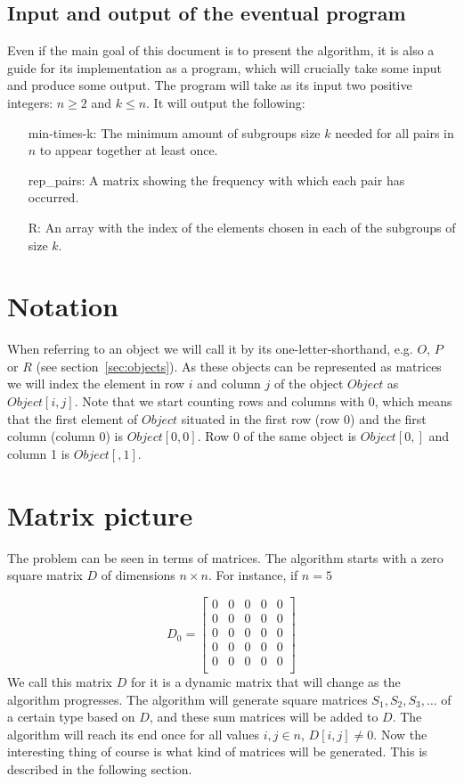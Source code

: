 \documentclass[a4paper]{article}
\begin{document}
\subsection{Input and output of the eventual program}

Even if the main goal of this document is to present the algorithm, it is also a guide for its implementation as a program, which will crucially take some input and produce some output.
The program will take as its input two positive integers: $ n \geq 2$ and $k \leq n$.
It will output the following:

\begin{itemize}
\item[min-times-k:]
The minimum amount of subgroups size $k$ needed for all pairs in $n$ to appear together at least once.
\item[rep\_pairs:]
A matrix showing the frequency with which each pair has occurred.
\item[R:] 
An array with the index of the elements chosen in each of the subgroups of size $k$.
\end{itemize}

\section{Notation}

When referring to an object we will call it by its one-letter-shorthand, e.g. $O$, $P$ or $R$ (see section~\ref{sec:objects}).
As these objects can be represented as matrices we will index the element in row $i$ and column $j$ of the object $Object$ as $Object[i,j]$.
Note that we start counting rows and columns with $0$,
which means that the first element of $Object$ situated in the first row (row 0) and the first column (column 0) is $Object[0,0]$.
Row 0 of the same object is $Object[0,]$ and column 1 is $Object[,1]$.

\section{Matrix picture}

The problem can be seen in terms of matrices.
The algorithm starts with a zero square matrix $D$ of dimensions $n \times n$.
For instance, if $n=5$

\[
D_0 =
\begin{bmatrix}
0 & 0 & 0 & 0 & 0 \\  
0 & 0 & 0 & 0 & 0 \\  
0 & 0 & 0 & 0 & 0 \\  
0 & 0 & 0 & 0 & 0 \\  
0 & 0 & 0 & 0 & 0 \\    
\end{bmatrix}  
\]
We call this matrix $D$ for it is a dynamic matrix that will change as the algorithm progresses.
The algorithm will generate square matrices $S_1, S_2, S_3, \ldots$ of a certain type based on $D$, and these sum matrices will be added to $D$.
The algorithm will reach its end once for all values $i,j \in n$, $D[i,j] \neq 0 $.
Now the interesting thing of course is what kind of matrices will be generated. This is described in the following section.
\end{document}
